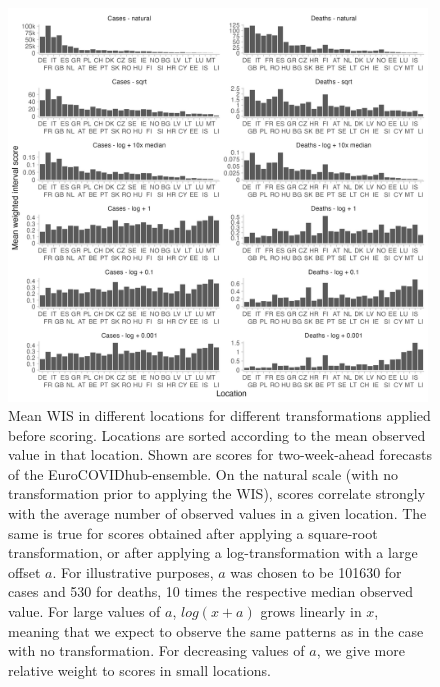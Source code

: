 \documentclass{article}
\begin{document}
\begin{figure}[h!]
    \centering
    \includegraphics[width=0.99\textwidth]{output/figures/HUB-scores-locations-log-variants.png}
    \caption{Mean WIS in different locations for different transformations applied before scoring. Locations are sorted according to the mean observed value in that location. Shown are scores for two-week-ahead forecasts of the EuroCOVIDhub-ensemble. On the natural scale (with no transformation prior to applying the WIS), scores correlate strongly with the average number of observed values in a given location. The same is true for scores obtained after applying a square-root transformation, or after applying a log-transformation with a large offset $a$. For illustrative purposes, $a$ was chosen to be 101630 for cases and 530 for deaths, 10 times the respective median observed value. For large values of $a$, $log(x + a)$ grows linearly in $x$, meaning that we expect to observe the same patterns as in the case with no transformation. For decreasing values of $a$, we give more relative weight to scores in small locations.}
    \label{fig:HUB-log-different-offsets}
\end{figure}




\clearpage

\end{document}
